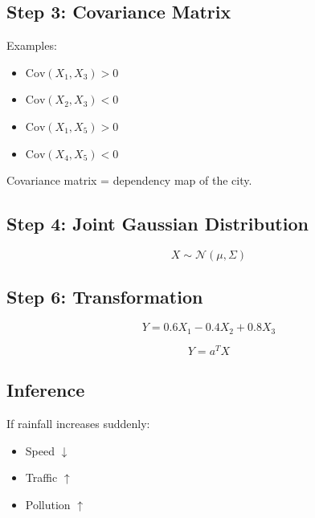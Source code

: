 \documentclass[12pt]{article}
\begin{document}
\subsection{Step 3: Covariance Matrix}

Examples:
\begin{itemize}
\item $\text{Cov}(X_1, X_3) > 0$
\item $\text{Cov}(X_2, X_3) < 0$
\item $\text{Cov}(X_1, X_5) > 0$
\item $\text{Cov}(X_4, X_5) < 0$
\end{itemize}

Covariance matrix = dependency map of the city.

\subsection{Step 4: Joint Gaussian Distribution}

\[
X \sim \mathcal{N}(\mu, \Sigma)
\]

\subsection{Step 6: Transformation}

\[
Y = 0.6X_1 - 0.4X_2 + 0.8X_3
\]

\[
Y = a^T X
\]

\subsection{Inference}

If rainfall increases suddenly:
\begin{itemize}
\item Speed $\downarrow$
\item Traffic $\uparrow$
\item Pollution $\uparrow$
\end{itemize}
\end{document}
